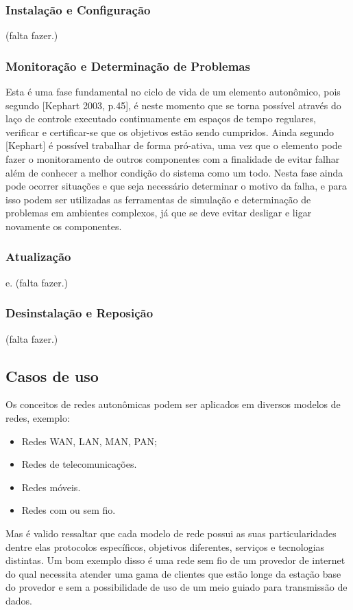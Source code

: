 \documentclass[11pt,twoside]{article}
\begin{document}
\subsubsection{Instalação e Configuração}
(falta fazer.)

\subsubsection{Monitoração e Determinação de Problemas}
Esta é uma fase fundamental no ciclo de vida de um elemento autonômico, pois segundo [Kephart 2003, p.45], é neste momento que se torna possível através do laço de controle executado continuamente em espaços de tempo regulares, verificar e certificar-se que os objetivos estão sendo cumpridos. Ainda segundo [Kephart] é possível trabalhar de forma pró-ativa, uma vez que o elemento pode fazer o monitoramento de outros componentes com a finalidade de evitar falhar além de conhecer a melhor condição do sistema como um todo. Nesta fase ainda pode ocorrer situações e que seja necessário determinar o motivo da falha, e para isso podem ser utilizadas as ferramentas de simulação e determinação de problemas em ambientes complexos, já que se deve evitar desligar e ligar novamente os componentes.
\subsubsection{Atualização}
e.	(falta fazer.)

\subsubsection{Desinstalação e Reposição}
(falta fazer.)

\subsection{Casos de uso}
Os conceitos de redes autonômicas podem ser aplicados em diversos modelos de redes, exemplo:
\begin{itemize}
	\item Redes WAN, LAN, MAN, PAN;
	\item Redes de telecomunicações.
	\item Redes móveis.
	\item Redes com ou sem fio.
\end{itemize}
Mas é valido ressaltar que cada modelo de rede possui as suas particularidades dentre elas protocolos específicos, objetivos diferentes, serviços e tecnologias distintas. Um bom exemplo disso é uma rede sem fio de um provedor de internet do qual necessita atender uma gama de clientes que estão longe da estação base do provedor e sem a possibilidade de uso de um meio guiado para transmissão de dados.
\end{document}
